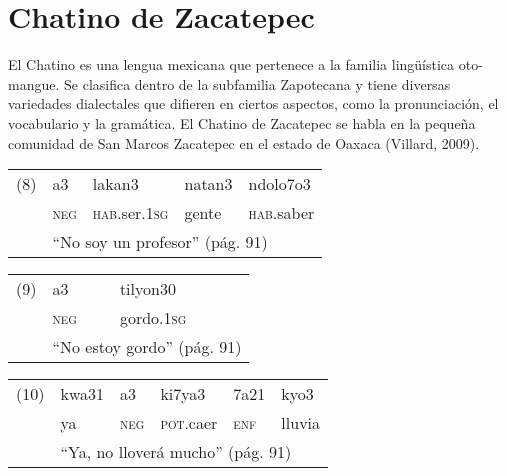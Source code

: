 \section*{Chatino de Zacatepec}

\noindent El Chatino es una lengua mexicana que pertenece a la familia lingüística oto-mangue. Se clasifica dentro de la subfamilia Zapotecana y tiene diversas variedades dialectales que difieren en ciertos aspectos, como la pronunciación, el vocabulario y la gramática. El Chatino de Zacatepec se habla en la pequeña comunidad de San Marcos Zacatepec en el estado de Oaxaca (Villard, 2009). \vspace{1cm}

{\setmainfont{Doulos SIL}
    \begin{tabular}{lllll}
        (8) & a3                                                 & lakan3              & natan3 & ndolo7o3  \\
            & \textsc{neg}                                       & \textsc{hab}.ser.\textsc{1sg} & gente  & \textsc{hab}.saber \\
            & \multicolumn{4}{l}{“No soy un profesor” (pág. 91)}                                            \\
    \end{tabular}
    \vspace{0.5cm}

    \begin{tabular}{lll}
        (9) & a3                                             & tilyon30          \\
            & \textsc{neg}                                   & gordo.\textsc{1sg} \\
            & \multicolumn{2}{l}{“No estoy gordo” (pág. 91)}                     \\
    \end{tabular}
    \vspace{0.5cm}

    \begin{tabular}{llllll}
        (10) & kwa31                                                & a3           & ki7ya3            & 7a21         & kyo3   \\
             & ya                                                   & \textsc{neg} & \textsc{pot}.caer & \textsc{enf} & lluvia \\
             & \multicolumn{5}{l}{“Ya, no lloverá mucho” (pág. 91)}                                                            \\
    \end{tabular}
} \vspace{1cm}

